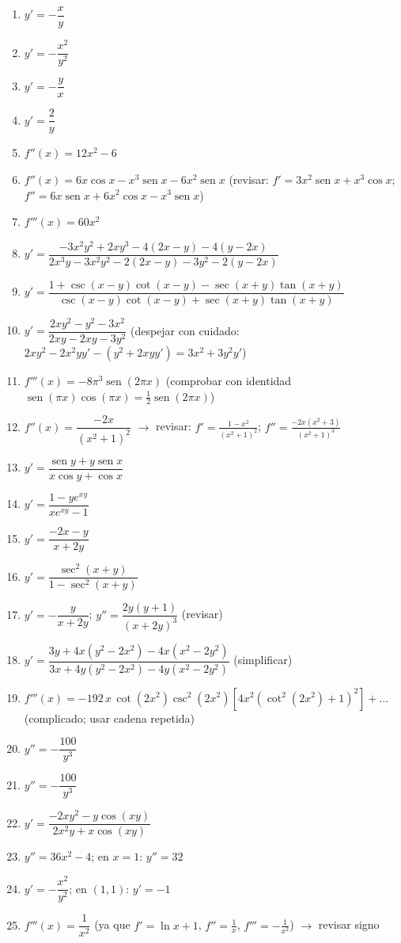 \documentclass[12pt, letterpaper]{article}
\begin{document}
  \begin{enumerate}[leftmargin=*, label=\textbf{\arabic*.}]
    \item $y' = -\dfrac{x}{y}$
    \item $y' = -\dfrac{x^2}{y^2}$
    \item $y' = -\dfrac{y}{x}$
    \item $y' = \dfrac{2}{y}$
    \item $f''(x) = 12x^2 - 6$
    \item $f''(x) = 6x\cos x - x^3\operatorname{sen} x - 6x^2\operatorname{sen} x$ (revisar: $f'=3x^2\operatorname{sen}x+x^3\cos x$; $f''=6x\operatorname{sen}x+6x^2\cos x-x^3\operatorname{sen}x$)
    \item $f'''(x) = 60x^2$
    \item $y' = \dfrac{-3x^2y^2 + 2xy^3 - 4(2x-y) - 4(y-2x)}{2x^3y - 3x^2y^2 - 2(2x-y) - 3y^2 - 2(y-2x)}$
    \item $y' = \dfrac{1 + \csc(x-y)\cot(x-y) - \sec(x+y)\tan(x+y)}{\csc(x-y)\cot(x-y) + \sec(x+y)\tan(x+y)}$
    \item $y' = \dfrac{2x y^2 - y^2 - 3x^2}{2xy - 2xy - 3y^2}$ (despejar con cuidado: $2xy^2 - 2x^2yy' - (y^2 + 2xyy') = 3x^2 + 3y^2y'$)
    \item $f'''(x) = -8\pi^3\operatorname{sen}(2\pi x)$ (comprobar con identidad $\operatorname{sen}(\pi x)\cos(\pi x) = \frac{1}{2}\operatorname{sen}(2\pi x)$)
    \item $f''(x) = \dfrac{-2x}{(x^2+1)^2}$ $\to$ revisar: $f'=\frac{1-x^2}{(x^2+1)^2}$; $f''=\frac{-2x(x^2+3)}{(x^2+1)^3}$
    \item $y' = \dfrac{\operatorname{sen} y + y\operatorname{sen} x}{x\cos y + \cos x}$
    \item $y' = \dfrac{1 - y e^{xy}}{x e^{xy} - 1}$
    \item $y' = \dfrac{-2x - y}{x + 2y}$
    \item $y' = \dfrac{\sec^2(x+y)}{1 - \sec^2(x+y)}$
    \item $y' = -\dfrac{y}{x + 2y}$; $y'' = \dfrac{2y(y+1)}{(x+2y)^3}$ (revisar)
    \item $y' = \dfrac{3y + 4x(y^2-2x^2) - 4x(x^2-2y^2)}{3x + 4y(y^2-2x^2) - 4y(x^2-2y^2)}$ (simplificar)
    \item $f'''(x) = -192\,x\,\cot(2x^2)\csc^2(2x^2)\left[4x^2(\cot^2(2x^2)+1)^2\right] + \dots$ (complicado; usar cadena repetida)
    \item $y'' = -\dfrac{100}{y^3}$ \checkmark
    \item $y'' = -\dfrac{100}{y^3}$
    \item $y' = \dfrac{-2xy^2 - y\cos(xy)}{2x^2y + x\cos(xy)}$
    \item $y'' = 36x^2 - 4$; en $x=1$: $y''=32$
    \item $y' = -\dfrac{x^2}{y^2}$; en $(1,1)$: $y' = -1$
    \item $f'''(x) = \dfrac{1}{x^2}$ (ya que $f'=\ln x+1$, $f''=\frac{1}{x}$, $f'''=-\frac{1}{x^2}$) $\to$ revisar signo

  \end{enumerate}
\fi
\end{document}
